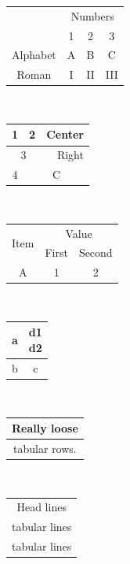 \documentclass{ctexart}
\begin{document}
\begin{tabular}{cccc}
    \toprule
             & \multicolumn{3}{c}{Numbers}            \\
    \cmidrule{2-4}
             & 1                           & 2  & 3   \\
    \midrule
    Alphabet & A                           & B  & C   \\
    Roman    & I                           & II & III \\
    \bottomrule
\end{tabular}
\\[1em]

\begin{tabular}{|c|c|c|}
    \hline
    1                      & 2                          & Center \\ \hline
    \multicolumn{2}{c|}{3} & \multicolumn{1}{r|}{Right}          \\ \hline
    4                      & \multicolumn{2}{c|}{C}              \\ \hline
\end{tabular}
\\[1em]

\begin{tabular}{ccc}
    \hline
    \multirow{2}{*}{Item} & \multicolumn{2}{c}{Value}          \\ \cline{2-3}
                          & First                     & Second \\ \hline
    A                     & 1                         & 2      \\ \hline
\end{tabular}
\\[1em]

\begin{tabular}{|c|c|}
    \hline
    a & \makecell{d1 \\ d2} \\
    \hline
    b & c            \\
    \hline
\end{tabular}
\\ [2em]

\begin{tabular}{|c|}
    \hline
    Really loose  \\ \hline
    tabular rows. \\ \hline
\end{tabular}
\\[1em]

\begin{tabular}{c}
    Head lines    \\ [6pt]
    tabular lines \\ [6pt]
    tabular lines \\ \hline
\end{tabular}
\\ [1em]
\end{document}
